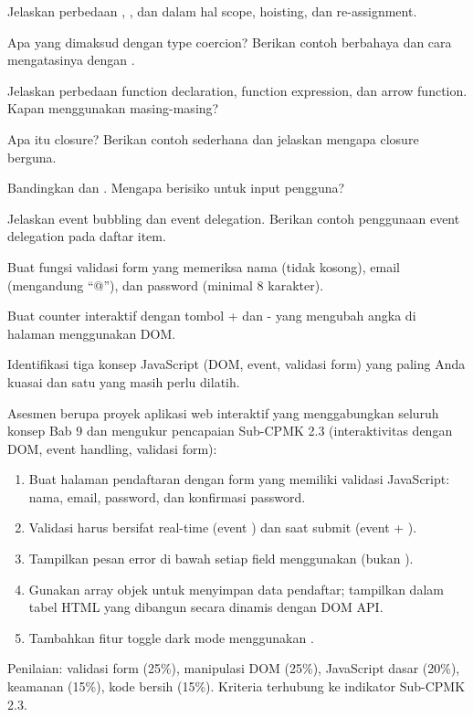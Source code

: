 \documentclass[../main.tex]{subfiles}
\begin{document}
\begin{latihan}
  \item Jelaskan perbedaan , , dan  dalam hal scope, hoisting, dan re-assignment.
  \item Apa yang dimaksud dengan type coercion? Berikan contoh berbahaya dan cara mengatasinya dengan \code{===}.
  \item Jelaskan perbedaan function declaration, function expression, dan arrow function. Kapan menggunakan masing-masing?
  \item Apa itu closure? Berikan contoh sederhana dan jelaskan mengapa closure berguna.
  \item Bandingkan  dan . Mengapa  berisiko untuk input pengguna?
  \item Jelaskan event bubbling dan event delegation. Berikan contoh penggunaan event delegation pada daftar item.
  \item Buat fungsi validasi form yang memeriksa nama (tidak kosong), email (mengandung ``@''), dan password (minimal 8 karakter).
  \item Buat counter interaktif dengan tombol + dan - yang mengubah angka di halaman menggunakan DOM.
  \item Identifikasi tiga konsep JavaScript (DOM, event, validasi form) yang paling Anda kuasai dan satu yang masih perlu dilatih.
\end{latihan}

\begin{asesmen}
Asesmen berupa proyek aplikasi web interaktif yang menggabungkan seluruh konsep Bab 9 dan mengukur pencapaian Sub-CPMK 2.3 (interaktivitas dengan DOM, event handling, validasi form):
\begin{enumerate}
  \item Buat halaman pendaftaran dengan form yang memiliki validasi JavaScript: nama, email, password, dan konfirmasi password.
  \item Validasi harus bersifat real-time (event ) dan saat submit (event  + ).
  \item Tampilkan pesan error di bawah setiap field menggunakan  (bukan ).
  \item Gunakan array objek untuk menyimpan data pendaftar; tampilkan dalam tabel HTML yang dibangun secara dinamis dengan DOM API.
  \item Tambahkan fitur toggle dark mode menggunakan .
\end{enumerate}
Penilaian: validasi form (25\%), manipulasi DOM (25\%), JavaScript dasar (20\%), keamanan (15\%), kode bersih (15\%). Kriteria terhubung ke indikator Sub-CPMK 2.3.
\end{asesmen}
\end{document}

